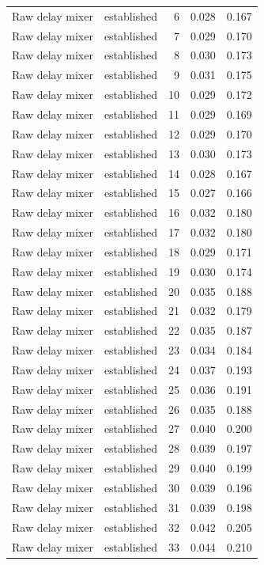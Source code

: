 \begin{tabular}{llrrr}
Raw delay mixer & established & 6 & 0.028 & 0.167 \\
Raw delay mixer & established & 7 & 0.029 & 0.170 \\
Raw delay mixer & established & 8 & 0.030 & 0.173 \\
Raw delay mixer & established & 9 & 0.031 & 0.175 \\
Raw delay mixer & established & 10 & 0.029 & 0.172 \\
Raw delay mixer & established & 11 & 0.029 & 0.169 \\
Raw delay mixer & established & 12 & 0.029 & 0.170 \\
Raw delay mixer & established & 13 & 0.030 & 0.173 \\
Raw delay mixer & established & 14 & 0.028 & 0.167 \\
Raw delay mixer & established & 15 & 0.027 & 0.166 \\
Raw delay mixer & established & 16 & 0.032 & 0.180 \\
Raw delay mixer & established & 17 & 0.032 & 0.180 \\
Raw delay mixer & established & 18 & 0.029 & 0.171 \\
Raw delay mixer & established & 19 & 0.030 & 0.174 \\
Raw delay mixer & established & 20 & 0.035 & 0.188 \\
Raw delay mixer & established & 21 & 0.032 & 0.179 \\
Raw delay mixer & established & 22 & 0.035 & 0.187 \\
Raw delay mixer & established & 23 & 0.034 & 0.184 \\
Raw delay mixer & established & 24 & 0.037 & 0.193 \\
Raw delay mixer & established & 25 & 0.036 & 0.191 \\
Raw delay mixer & established & 26 & 0.035 & 0.188 \\
Raw delay mixer & established & 27 & 0.040 & 0.200 \\
Raw delay mixer & established & 28 & 0.039 & 0.197 \\
Raw delay mixer & established & 29 & 0.040 & 0.199 \\
Raw delay mixer & established & 30 & 0.039 & 0.196 \\
Raw delay mixer & established & 31 & 0.039 & 0.198 \\
Raw delay mixer & established & 32 & 0.042 & 0.205 \\
Raw delay mixer & established & 33 & 0.044 & 0.210 \\

\end{tabular}
